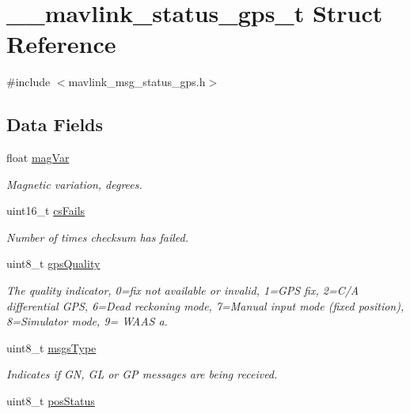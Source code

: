 \hypertarget{struct____mavlink__status__gps__t}{\section{\+\_\+\+\_\+mavlink\+\_\+status\+\_\+gps\+\_\+t Struct Reference}
\label{struct____mavlink__status__gps__t}
}


{\ttfamily \#include $<$mavlink\+\_\+msg\+\_\+status\+\_\+gps.\+h$>$}

\subsection*{Data Fields}
\begin{DoxyCompactItemize}
\item 
float \hyperlink{struct____mavlink__status__gps__t_a41cbb27a8dac54c0b56e8408207cbbad}{mag\+Var}
\begin{DoxyCompactList}\small\item\em Magnetic variation, degrees. \end{DoxyCompactList}\item 
uint16\+\_\+t \hyperlink{struct____mavlink__status__gps__t_a81ba591419b5bac3886e78638b074ade}{cs\+Fails}
\begin{DoxyCompactList}\small\item\em Number of times checksum has failed. \end{DoxyCompactList}\item 
uint8\+\_\+t \hyperlink{struct____mavlink__status__gps__t_ad31a7b94c10f0c7ad7bc3a65aa00b629}{gps\+Quality}
\begin{DoxyCompactList}\small\item\em The quality indicator, 0=fix not available or invalid, 1=G\+P\+S fix, 2=C/\+A differential G\+P\+S, 6=Dead reckoning mode, 7=Manual input mode (fixed position), 8=Simulator mode, 9= W\+A\+A\+S a. \end{DoxyCompactList}\item 
uint8\+\_\+t \hyperlink{struct____mavlink__status__gps__t_a96c027a987f25db1277acc899a396451}{msgs\+Type}
\begin{DoxyCompactList}\small\item\em Indicates if G\+N, G\+L or G\+P messages are being received. \end{DoxyCompactList}\item 
uint8\+\_\+t \hyperlink{struct____mavlink__status__gps__t_acae74afd8a08e75f2235006688fe6b47}{pos\+Status}

\end{DoxyCompactItemize}
